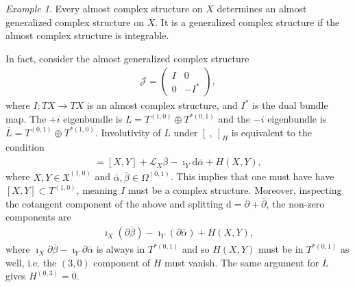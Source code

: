 \documentclass{article}
\newcommand{\JJ}{\mathcal{J}}
\newcommand{\XX}{\mathfrak{X}}
\newcommand{\Lie}{\mathcal{L}}
\newcommand{\ap}{\alpha}
\newcommand{\bt}{\beta}
\newcommand{\p}{\partial}
\newcommand{\rd}{\mathrm{d}}
\newcommand{\brac}{[\ ,\ ]}
\theoremstyle{definition}
\theoremstyle{definition}
\theoremstyle{remark}
\newtheorem{Ex}[theorem]{Example}
\begin{document}
\begin{Ex}\label{ex: complexstr}
Every almost complex structure on $X$ determines an almost generalized complex structure on $X$. 
It is a generalized complex structure if the almost complex structure is integrable.

In fact, consider the almost generalized complex structure
\begin{align*}
\JJ=
\begin{pmatrix}
I & 0 \\
0 & -I^*
\end{pmatrix},
\end{align*}
where $I : TX \to TX$ is an almost complex structure, and $I^*$ is the dual bundle map.
The $+i$ eigenbundle is $L=T^{(1,0)}\oplus T^{*(0,1)}$ and the $-i$ eigenbundle is $\bar{L}=T^{(0,1)}\oplus T^{*(1,0)}$. 
Involutivity of $L$ under $\brac_H$ is equivalent to the condition
\begin{align*}
[X+\bar{\ap},Y+\bar{\bt}]=[X,Y]+\Lie_X\bar{\bt}-\imath_Y\rd \bar{\ap}+H(X,Y),
\end{align*}
where $X,Y\in \XX^{(1,0)}$ and $\bar{\ap},\bar{\bt}\in \Omega^{(0,1)}$.
This implies that one must have have $[X,Y]\subset T^{(1,0)}$, meaning $I$ must be a complex structure. 
Moreover, inspecting the cotangent component of the above and splitting $\rd=\p+\bar{\p}$, the non-zero components are
\begin{align*}
\imath_X(\p\bar{\bt})-\imath_Y(\p \bar{\ap})+H(X,Y),
\end{align*}
where $\imath_X\p\bar{\bt}-\imath_Y\p \bar{\ap}$ is always in $T^{*(0,1)}$ and so $H(X,Y)$ must be in $T^{*(0,1)}$ as well, i.e. the $(3,0)$ component of $H$ must vanish. The same argument for $\bar{L}$ gives $H^{(0,3)}=0$.
\end{Ex}
\end{document}
